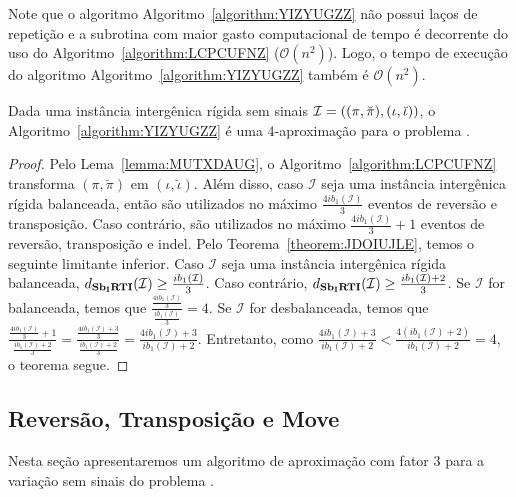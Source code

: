 Note que o algoritmo Algoritmo~\ref{algorithm:YIZYUGZZ} não possui laços de repetição e a subrotina com maior gasto computacional de tempo é decorrente do uso do Algoritmo~\ref{algorithm:LCPCUFNZ} ($\mathcal{O}(n^2)$). Logo, o tempo de execução do algoritmo Algoritmo~\ref{algorithm:YIZYUGZZ} também é $\mathcal{O}(n^2)$.

\begin{theorem}\label{theorem:ZEIGUWRR}
Dada uma instância intergênica rígida sem sinais $\mathcal{I}=((\pi,\breve\pi),\break(\iota,\breve\iota))$, o Algoritmo~\ref{algorithm:YIZYUGZZ} é uma $4$-aproximação para o problema \SbIRTI{}.
\end{theorem}
\begin{proof}
Pelo Lema~\ref{lemma:MUTXDAUG}, o Algoritmo~\ref{algorithm:LCPCUFNZ} transforma $(\pi,\breve\pi)$ em $(\iota,\breve\iota)$. Além disso, caso $\mathcal{I}$ seja uma instância intergênica rígida balanceada, então são utilizados no máximo $\frac{4ib_1(\mathcal{I})}{3}$ eventos de reversão e transposição. Caso contrário, são utilizados no máximo $\frac{4ib_1(\mathcal{I})}{3} + 1$ eventos de reversão, transposição e indel. Pelo Teorema~\ref{theorem:JDOIUJLE}, temos o seguinte limitante inferior. Caso $\mathcal{I}$ seja uma instância intergênica rígida balanceada, $d_{\textbf{Sb\textsubscript{I}RTI}}(\mathcal{I}) \ge \frac{ib_1(\mathcal{I})}{3}$. Caso contrário, $d_{\textbf{Sb\textsubscript{I}RTI}}(\mathcal{I}) \ge \frac{ib_1(\mathcal{I}) + 2}{3}$. Se $\mathcal{I}$ for balanceada, temos que $\frac{\frac{4ib_1(\mathcal{I})}{3}}{\frac{ib_1(\mathcal{I})}{3}}=4$. Se $\mathcal{I}$ for desbalanceada,  temos que $\frac{\frac{4ib_1(\mathcal{I})}{3} + 1}{\frac{ib_1(\mathcal{I}) + 2}{3}}=\frac{\frac{4ib_1(\mathcal{I})+3}{3}}{\frac{ib_1(\mathcal{I}) + 2}{3}}=\frac{4ib_1(\mathcal{I})+3}{ib_1(\mathcal{I})+2}$. Entretanto, como $\frac{4ib_1(\mathcal{I})+3}{ib_1(\mathcal{I})+2}<\frac{4(ib_1(\mathcal{I})+2)}{ib_1(\mathcal{I})+2}=4$, o teorema segue.
\end{proof}

\subsection{Reversão, Transposição e Move}

Nesta seção apresentaremos um algoritmo de aproximação com fator $3$ para a variação sem sinais do problema \SbIRTM{}. 

